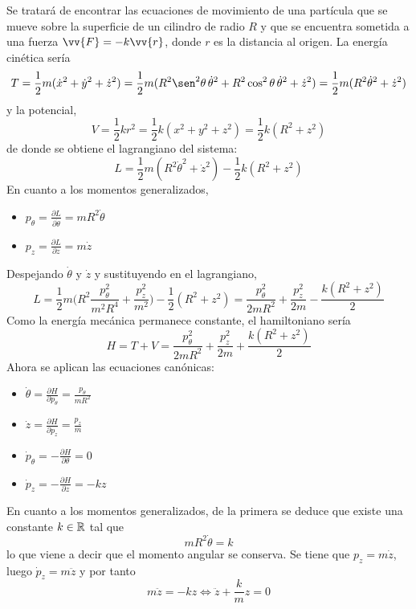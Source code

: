 \documentclass[12pt]{report}
\begin{document}
\begin{example}
Se tratará de encontrar las ecuaciones de movimiento de una partícula que se mueve sobre la superficie de un cilindro de radio $R$ y que se encuentra sometida a una fuerza $\vv{F}=-k\vv{r}$, donde $r$ es la distancia al origen. La energía cinética sería
\[T = \frac{1}{2}m(\dot{x}^2+\dot{y}^2+\dot{z}^2) = \frac{1}{2}m(R^2\sen^2\theta \, \dot{\theta}^2+R^2\cos^2\theta \, \dot{\theta}^2+\dot{z}^2) = \frac{1}{2}m(R^2 \dot{\theta}^2 + \dot{z}^2)\]
y la potencial,
\[V = \frac{1}{2}kr^2 = \frac{1}{2}k(x^2+y^2+z^2) = \frac{1}{2}k(R^2+z^2)\]
de donde se obtiene el lagrangiano del sistema:
\[L = \frac{1}{2}m(R^2 \dot{\theta}^2 + \dot{z}^2)-\frac{1}{2}k(R^2+z^2)\]
En cuanto a los momentos generalizados,
\begin{itemize}
    \item $\displaystyle p_\theta = \frac{\partial L}{\partial \dot{\theta}} = mR^2\dot{\theta}$
    \item $\displaystyle p_z = \frac{\partial L}{\partial z} = m\dot{z}$
\end{itemize}
Despejando $\dot{\theta}$ y $\dot{z}$ y sustituyendo en el lagrangiano,
\[L = \frac{1}{2}m\biggl(R^2 \frac{p_\theta^2}{m^2R^4}+ \frac{p_z^2}{m^2} \biggr) - \frac{1}{2}(R^2+z^2) = \frac{p_\theta^2}{2mR^2}+\frac{p_z^2}{2m}-\frac{k(R^2+z^2)}{2}\]
Como la energía mecánica permanece constante, el hamiltoniano sería
\[H = T + V = \frac{p_\theta^2}{2mR^2}+\frac{p_z^2}{2m}+\frac{k(R^2+z^2)}{2}\]
Ahora se aplican las ecuaciones canónicas:
\begin{multicols}{2}

\begin{itemize}
    \item $\displaystyle \dot{\theta} = \frac{\partial H}{\partial p_\theta} = \frac{p_\theta}{mR^2}$
    \item $\displaystyle \dot{z} = \frac{\partial H}{\partial p_z} = \frac{p_z}{m}$
\end{itemize}

\columnbreak

\begin{itemize}
    \item $\displaystyle \dot{p}_\theta = -\frac{\partial H}{\partial \theta} = 0$
    \item $\displaystyle \dot{p}_z = -\frac{\partial H}{\partial z} = -kz$
\end{itemize}

\end{multicols}

\noindent En cuanto a los momentos generalizados, de la primera se deduce que existe una constante $k \in \mathbb R$ tal que
\[mR^2\dot{\theta} = k\]
lo que viene a decir que el momento angular se conserva. Se tiene que $p_z = m \dot{z}$, luego $\dot{p}_z = m \ddot{z}$ y por tanto
\[m\ddot{z} = -kz \iff \ddot{z} +\frac{k}{m}z = 0\]

\end{example}
\end{document}
